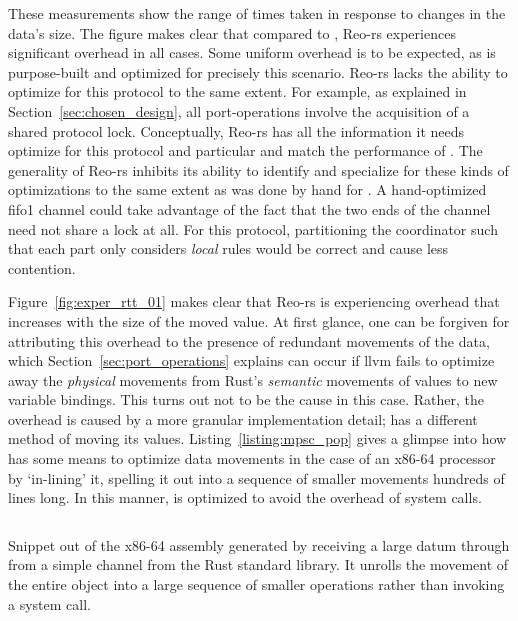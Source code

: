 These measurements show the range of times taken in response to changes in the data's size. The figure makes clear that compared to , Reo-rs experiences significant overhead in all cases. Some uniform overhead is to be expected, as  is purpose-built and optimized for precisely this scenario. Reo-rs lacks the ability to optimize for this protocol to the same extent. For example, as explained in Section~\ref{sec:chosen_design}, all port-operations involve the acquisition of a shared protocol lock. Conceptually, Reo-rs has all the information it needs optimize for this protocol and particular and match the performance of . The generality of Reo-rs inhibits its ability to identify and specialize for these kinds of optimizations to the same extent as was done by hand for . A hand-optimized fifo1 channel could take advantage of the fact that the two ends of the channel need not share a lock at all. For this protocol, partitioning the coordinator such that each part only considers \textit{local} rules would be correct and cause less contention.

Figure~\ref{fig:exper_rtt_01} makes clear that Reo-rs is experiencing overhead that increases with the size of the moved value. At first glance, one can be forgiven for attributing this overhead to the presence of redundant movements of the data, which Section~\ref{sec:port_operations} explains can occur if llvm fails to optimize away the \textit{physical} movements from Rust's \textit{semantic} movements of values to new variable bindings. This turns out not to be the cause in this case. Rather, the overhead is caused by a more granular implementation detail;  has a different method of moving its values. Listing~\ref{listing:mpsc_pop} gives a glimpse into how  has some means to optimize data movements in the case of an x86-64 processor by `in-lining' it, spelling it out into a sequence of smaller movements hundreds of lines long. In this manner,  is optimized to avoid the overhead of system calls.

\begin{listing}[h!]
	\centering
	\inputminted{text}{mpsc_pop.txt}
	\caption[x86-64 assembly of a standard Rust channel, showing in-lining.]{Snippet out of the x86-64 assembly generated by receiving a large datum through  from a simple channel from the Rust standard library. It unrolls the movement of the entire object into a large sequence of smaller operations rather than invoking a system call.}
	\label{listing:mpsc_pop}
\end{listing}


